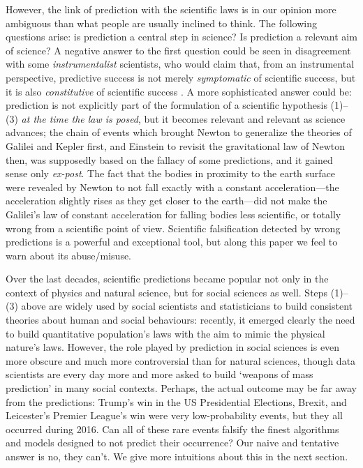 \documentclass{statsoc}
\begin{document}
However, the link of prediction with the scientific laws is in our opinion more ambiguous than what people are usually inclined to think. The following questions arise: is prediction a central step in science? 
Is prediction a relevant aim of science? 
A negative answer to the first question could be seen in disagreement with some 
\emph{instrumentalist} scientists, who would claim that, from an instrumental perspective, predictive success is not merely \emph{symptomatic} of scientific success, but it is also 
\emph{constitutive} of scientific success \citep{hitchcock2004prediction}. A more sophisticated answer could be:  prediction is not explicitly part of the formulation of a 
scientific hypothesis (1)--(3) \emph{at the time the law is posed}, but it becomes relevant and relevant as science advances; the chain of events which brought Newton to 
generalize the theories of Galilei and Kepler first, and Einstein to revisit the gravitational law of Newton then, was supposedly based on the fallacy of some predictions, and it gained sense 
only \emph{ex-post}. The fact that the bodies in proximity to the earth surface were revealed by Newton to not fall exactly with a constant acceleration---the acceleration slightly 
rises as they get closer to the earth---did not make the Galilei's law of constant acceleration for falling bodies less scientific, or totally wrong from a scientific point of view. Scientific falsification detected by wrong predictions \citep{popper1934logic} is a powerful and exceptional tool, but along this paper we feel to warn about its abuse/misuse. 

Over the last decades, scientific predictions became popular not only in the context of physics and natural science, but for social sciences as well. Steps (1)--(3) above are widely used by social scientists and statisticians to build consistent theories about human and social behaviours: recently, it emerged clearly the need to build quantitative population's laws with the aim to mimic the physical nature's laws.  However, the role played by 
prediction in social sciences is even more obscure \citep{popper1944poverty, popper1945poverty} and much more controversial than for natural sciences, though data scientists are every day more and more asked to build 
`weapons of mass prediction' in many social contexts. 
Perhaps, the actual outcome may be far away from the predictions: Trump's win in the US 
Presidential Elections, Brexit, and Leicester's Premier League's win were very low-probability events, but they all occurred during 2016. Can all of these rare events falsify the finest algorithms and models designed to not predict their occurrence? Our naive and tentative answer is no, they can't. We give more intuitions about this in the next section.
\end{document}
